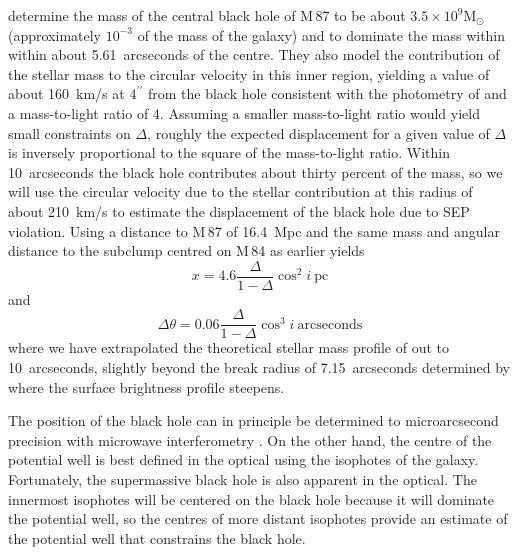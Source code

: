\documentclass[useAMS,usenatbib]{mn2e}
\newcommand{\msun}{\mathrm{M}_\odot}
\begin{document}
\citet{2013ApJ...770...86W} determine the mass of the central black
hole of M\,87 to be about $3.5 \times 10^{9} \msun$ (approximately
$10^{-3}$ of the mass of the galaxy) and to dominate the mass within
within about 5.61~arcseconds of the centre.  They also model the
contribution of the stellar mass to the circular velocity in this
inner region, yielding a value of about 160~km/s at $4^{\prime\prime}$
from the black hole consistent with the photometry of
\citet{2006ApJS..164..334F} and a mass-to-light ratio of 4. Assuming a
smaller mass-to-light ratio would yield small 
constraints 
on $\Delta$,
roughly the expected displacement for a given value of $\Delta$ is
inversely proportional to the square of the mass-to-light ratio.
Within 10~arcseconds the black hole contributes about thirty percent
of the mass, so we will use the circular velocity due to the stellar
contribution at this radius of about 210~km/s to estimate the
displacement of the black hole due to SEP violation.  Using a distance
to M\,87 of 16.4~Mpc \citep{2010A&A...524A..71B} and the same mass and
angular distance to the subclump centred on M\,84 as earlier yields
\begin{equation}
  x = 4.6 \frac{\Delta}{1-\Delta} \cos^2 i ~\mathrm{pc}
  \label{eq:18}
\end{equation}
and
\begin{equation}
    \Delta \theta = 0.06 \frac{\Delta}{1-\Delta} \cos^3 i~
    \mathrm{arcseconds}
    \label{eq:17}
\end{equation}
where we have extrapolated the theoretical stellar mass profile of
\citet{2013ApJ...770...86W} out to 10~arcseconds, slightly beyond the
break radius of 7.15~arcseconds determined by
\cite{2006ApJS..164..334F} where the surface brightness profile
steepens.


The position of the black hole can in principle be determined to
microarcsecond precision with microwave interferometry
\citep{2011ApJ...735...57B}.  On the other hand, the centre of the
potential well is best defined in the optical using the isophotes of
the galaxy.  Fortunately, the supermassive black hole is also apparent
in the optical.  The innermost isophotes will be centered on the black
hole because it will dominate the potential well, so the centres of
more distant isophotes provide an estimate of the potential well that
constrains the black hole.
\end{document}
